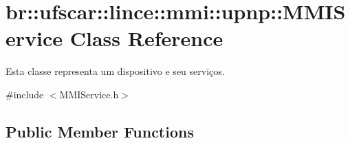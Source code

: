\hypertarget{classbr_1_1ufscar_1_1lince_1_1mmi_1_1upnp_1_1MMIService}{
\section{br::ufscar::lince::mmi::upnp::MMIService Class Reference}
\label{classbr_1_1ufscar_1_1lince_1_1mmi_1_1upnp_1_1MMIService}
}


Esta classe representa um dispositivo e seu serviços.  




{\ttfamily \#include $<$MMIService.h$>$}

\subsection*{Public Member Functions}

